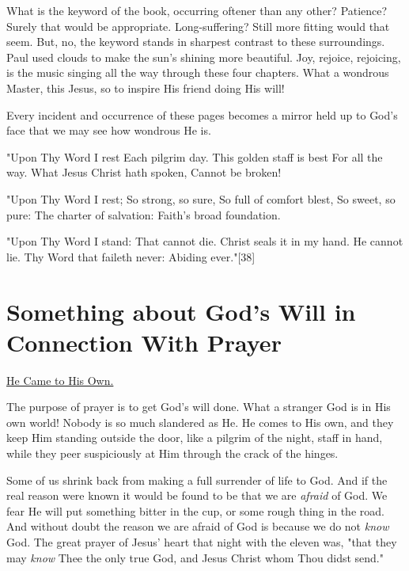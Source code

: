 What is the keyword of the book, occurring oftener than any other?
Patience? Surely that would be appropriate. Long-suffering? Still more
fitting would that seem. But, no, the keyword stands in sharpest contrast
to these surroundings. Paul used clouds to make the sun's shining more
beautiful. Joy, rejoice, rejoicing, is the music singing all the way
through these four chapters. What a wondrous Master, this Jesus, so to
inspire His friend doing His will!

Every incident and occurrence of these pages becomes a mirror held up to
God's face that we may see how wondrous He is.

    "Upon Thy Word I rest
      Each pilgrim day.
    This golden staff is best
      For all the way.
    What Jesus Christ hath spoken,
      Cannot be broken!

    "Upon Thy Word I rest;
      So strong, so sure,
    So full of comfort blest,
      So sweet, so pure:
    The charter of salvation:
      Faith's broad foundation.

    "Upon Thy Word I stand:
      That cannot die.
    Christ seals it in my hand.
      He cannot lie.
    Thy Word that faileth never:
      Abiding ever."[38]




\chapter{Something about God's Will in Connection With Prayer}



\underline{He Came to His Own.}


The purpose of prayer is to get God's will done. What a stranger God is in
His own world! Nobody is so much slandered as He. He comes to His own, and
they keep Him standing outside the door, like a pilgrim of the night,
staff in hand, while they peer suspiciously at Him through the crack of
the hinges.

Some of us shrink back from making a full surrender of life to God. And if
the real reason were known it would be found to be that we are \textit{afraid} of
God. We fear He will put something bitter in the cup, or some rough thing
in the road. And without doubt the reason we are afraid of God is because
we do not \textit{know} God. The great prayer of Jesus' heart that night with the
eleven was, "that they may \textit{know} Thee the only true God, and Jesus
Christ whom Thou didst send."

